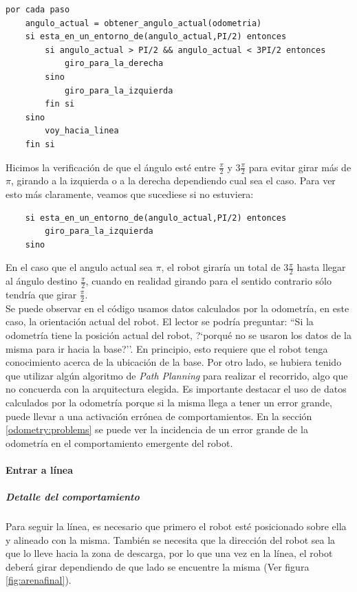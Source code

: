 \begin{verbatim}
por cada paso
    angulo_actual = obtener_angulo_actual(odometria)
    si esta_en_un_entorno_de(angulo_actual,PI/2) entonces
        si angulo_actual > PI/2 && angulo_actual < 3PI/2 entonces
            giro_para_la_derecha
        sino
            giro_para_la_izquierda
        fin si
    sino
        voy_hacia_linea
    fin si
\end{verbatim}

Hicimos la verificaci\'on de que el \'angulo est\'e entre $\frac{\pi}{2}$ y $3\frac{\pi}{2}$
para evitar girar m\'as de $\pi$, girando a la izquierda o a la derecha dependiendo
cual sea el caso. Para ver esto m\'as claramente, veamos que sucediese si no estuviera:
\begin{verbatim}
    si esta_en_un_entorno_de(angulo_actual,PI/2) entonces
        giro_para_la_izquierda
    sino
\end{verbatim}
En el caso que el angulo actual sea $\pi$, el robot girar\'ia un total de $3\frac{\pi}{2}$
hasta llegar al \'angulo destino $\frac{\pi}{2}$, cuando en realidad girando para el sentido
contrario s\'olo tendr\'ia que girar $\frac{\pi}{2}$.
\\
Se puede observar en el c\'odigo usamos datos calculados por la odometr\'ia, en
este caso, la orientaci\'on actual del robot. El lector se podr\'ia preguntar:
``Si la odometr\'ia tiene la posici\'on actual del robot, ?`porqu\'e no se usaron los datos
de la misma para ir hacia la base?''. En principio, esto requiere que el robot tenga
conocimiento acerca de la ubicaci\'on de la base. Por otro lado, se hubiera tenido que utilizar
alg\'un algoritmo de \emph{Path Planning} para realizar el recorrido, algo que no
concuerda con la arquitectura elegida.
Es importante destacar el uso de datos calculados por la odometr\'ia porque si la misma
llega a tener un error grande, puede llevar a una activaci\'on err\'onea de comportamientos.
En la secci\'on \ref{odometry:problems} se puede ver la incidencia de un error grande de
la odometr\'ia en el comportamiento emergente del robot.

\paragraph{Entrar a l\'inea}
\label{enter_line}
\subparagraph{Detalle del comportamiento}

Para seguir la l\'inea, es necesario que primero el robot est\'e posicionado sobre ella
y alineado con la misma. Tambi\'en se necesita que la direcci\'on del robot sea la que
lo lleve hacia la zona de descarga, por lo que una vez en la l\'inea, el robot deber\'a
girar dependiendo de que lado se encuentre la misma (Ver figura \ref{fig:arenafinal}).

